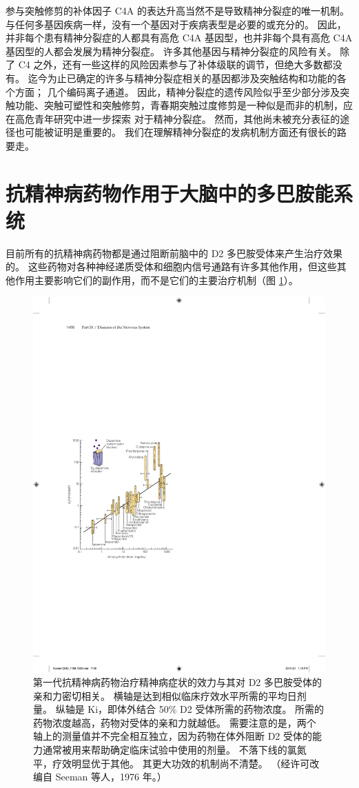 参与突触修剪的补体因子 C4A 的表达升高当然不是导致精神分裂症的唯一机制。 与任何多基因疾病一样，没有一个基因对于疾病表型是必要的或充分的。 因此，并非每个患有精神分裂症的人都具有高危 C4A 基因型，也并非每个具有高危 C4A 基因型的人都会发展为精神分裂症。 许多其他基因与精神分裂症的风险有关。 除了 C4 之外，还有一些这样的风险因素参与了补体级联的调节，但绝大多数都没有。 迄今为止已确定的许多与精神分裂症相关的基因都涉及突触结构和功能的各个方面； 几个编码离子通道。 因此，精神分裂症的遗传风险似乎至少部分涉及突触功能、突触可塑性和突触修剪，青春期突触过度修剪是一种似是而非的机制，应在高危青年研究中进一步探索 对于精神分裂症。 然而，其他尚未被充分表征的途径也可能被证明是重要的。 我们在理解精神分裂症的发病机制方面还有很长的路要走。

\section{抗精神病药物作用于大脑中的多巴胺能系统}
目前所有的抗精神病药物都是通过阻断前脑中的 D2 多巴胺受体来产生治疗效果的。 这些药物对各种神经递质受体和细胞内信号通路有许多其他作用，但这些其他作用主要影响它们的副作用，而不是它们的主要治疗机制（图 \ref{fig:60_8}）。

\begin{figure}[htbp]
	\centering
	\includegraphics[width=0.5\linewidth]{chap60/fig_60_8}
	\caption{第一代抗精神病药物治疗精神病症状的效力与其对 D2 多巴胺受体的亲和力密切相关。 横轴是达到相似临床疗效水平所需的平均日剂量。 纵轴是 Ki，即体外结合 50\% D2 受体所需的药物浓度。 所需的药物浓度越高，药物对受体的亲和力就越低。 需要注意的是，两个轴上的测量值并不完全相互独立，因为药物在体外阻断 D2 受体的能力通常被用来帮助确定临床试验中使用的剂量。 不落下线的氯氮平，疗效明显优于其他。 其更大功效的机制尚不清楚。 （经许可改编自 Seeman 等人，1976 年。）}
	\label{fig:60_8}
\end{figure}

